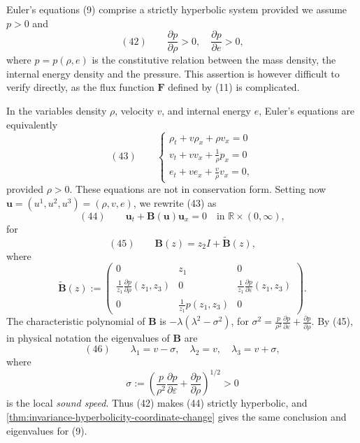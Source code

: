 \begin{example}
\label{ex:euler-equations-strict-hyperbolicity}

Euler's equations (9) comprise a strictly hyperbolic system provided we assume $p>0$ and
$$(42) \qquad \frac{\partial p}{\partial\rho}>0, \quad \frac{\partial p}{\partial e}>0,$$
where $p=p(\rho,e)$ is the constitutive relation between the mass density, the internal energy density and the pressure. This assertion is however difficult to verify directly, as the flux function $\mathbf{F}$ defined by (11) is complicated.

In the variables density $\rho$, velocity $v$, and internal energy $e$, Euler's equations are equivalently
$$(43) \qquad \begin{cases} \rho_t + v\rho_x + \rho v_x = 0 \\ v_t + vv_x + \frac{1}{\rho}p_x = 0 \\ e_t + ve_x + \frac{v}{\rho}v_x = 0, \end{cases}$$
provided $\rho>0$. These equations are not in conservation form. Setting now $\mathbf{u}=(u^1,u^2,u^3)=(\rho,v,e)$, we rewrite (43) as
$$(44) \qquad \mathbf{u}_t + \mathbf{B}(\mathbf{u})\mathbf{u}_x = 0 \quad \text{in } \mathbb{R}\times(0,\infty),$$
for
$$(45) \qquad \mathbf{B}(z) = z_2 I + \tilde{\mathbf{B}}(z),$$
where
$$\tilde{\mathbf{B}}(z) := \begin{pmatrix} 0 & z_1 & 0 \\ \frac{1}{z_1}\frac{\partial p}{\partial\rho}(z_1,z_3) & 0 & \frac{1}{z_1}\frac{\partial p}{\partial\varepsilon}(z_1,z_3) \\ 0 & \frac{1}{z_1}p(z_1,z_3) & 0 \end{pmatrix}.$$
The characteristic polynomial of $\mathbf{B}$ is $-\lambda(\lambda^2-\sigma^2)$, for $\sigma^2 = \frac{p}{\rho^2}\frac{\partial p}{\partial\varepsilon} + \frac{\partial p}{\partial\rho}$. By (45), in physical notation the eigenvalues of $\mathbf B$ are
$$(46) \qquad \lambda_1 = v-\sigma, \quad \lambda_2 = v, \quad \lambda_3 = v+\sigma,$$
where
$$\sigma := \left(\frac{p}{\rho^2}\frac{\partial p}{\partial\varepsilon} + \frac{\partial p}{\partial\rho}\right)^{1/2} > 0$$
is the local \textit{sound speed}. Thus (42) makes (44) strictly hyperbolic, and \cref{thm:invariance-hyperbolicity-coordinate-change} gives the same conclusion and eigenvalues for (9).
\end{example}

